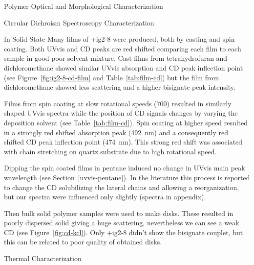 \begin{section}{Polymer Optical and Morphological Characterization}
\begin{subsection}{Circular Dichroism Spectroscopy Characterization}
\begin{subsubsection}{In Solid State}
Many films of \cmpd+{ig2-8} were produced, both by casting and spin coating. Both \gls{UVvis} and \gls{CD} peaks are red shifted comparing each film to each sample in good-poor solvent mixture. Cast films from tetrahydrofuran and dichloromethane showed similar \gls{UVvis} absorption 
and \gls{CD} peak inflection point (see Figure~\ref{fig:ig2-8-cd-film} and Table~\ref{tab:film-cd}) but the film from dichloromethane showed less scattering and a higher bisignate peak intensity.

Films from spin coating at slow rotational speeds (\SI{700}{\rpm}) resulted in similarly shaped \gls{UVvis} spectra while the position of 
\gls{CD} signals changes by varying the deposition solvent (see Table~\ref{tab:film-cd}). Spin coating at higher speed resulted in a strongly red shifted absorption peak (\SI{492}{\nm}) and a consequently red shifted \gls{CD} peak inflection point (\SI{474}{\nm}). This strong red shift was associated with chain stretching on quartz substrate due to high rotational speed.

Dipping the spin coated films in pentane induced no change in \gls{UVvis} main peak wavelength (see Section~\ref{uvvis-pentane}). In the literature this process is reported to change the \gls{CD} solubilizing the lateral chains and allowing a reorganization, but our spectra were influenced only slightly (spectra in appendix).

\begin{SCfigure}[][tbp]%
 \caption{Circular dichroism spectra of polymers \cmpd+{ig2-4}, \cmpd+{ig2-15} and \cmpd+{ig2-8} in  disks.}
\label{fig:cd-kcl}
\end{SCfigure}

Then bulk solid polymer samples were used to make  disks. These resulted in poorly dispersed solid giving a huge scattering, nevertheless we can see a weak \gls{CD} (see Figure~\ref{fig:cd-kcl}). Only \cmpd+{ig2-8} didn't show the bisignate couplet, but this can be related to poor quality of obtained disks. 
\end{subsubsection}
\end{subsection}
\begin{subsection}{Thermal Characterization}


\end{subsection}
\end{section}
